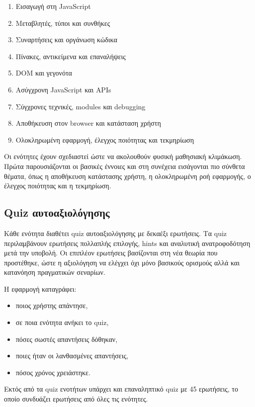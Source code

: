 \documentclass[12pt,a4paper]{article}
\newcommand{\textlatin}[1]{\textenglish{#1}}
\begin{document}
\begin{enumerate}[leftmargin=1.2cm]
  \item Εισαγωγή στη \textlatin{JavaScript}
  \item Μεταβλητές, τύποι και συνθήκες
  \item Συναρτήσεις και οργάνωση κώδικα
  \item Πίνακες, αντικείμενα και επαναλήψεις
  \item \textlatin{DOM} και γεγονότα
  \item Ασύγχρονη \textlatin{JavaScript} και \textlatin{APIs}
  \item Σύγχρονες τεχνικές, \textlatin{modules} και debugging
  \item Αποθήκευση στον browser και κατάσταση χρήστη
  \item Ολοκληρωμένη εφαρμογή, έλεγχος ποιότητας και τεκμηρίωση
\end{enumerate}

Οι ενότητες έχουν σχεδιαστεί ώστε να ακολουθούν φυσική μαθησιακή κλιμάκωση. Πρώτα παρουσιάζονται οι βασικές έννοιες και στη συνέχεια εισάγονται πιο σύνθετα θέματα, όπως η αποθήκευση κατάστασης χρήστη, η ολοκληρωμένη ροή εφαρμογής, ο έλεγχος ποιότητας και η τεκμηρίωση.

\subsection{Quiz αυτοαξιολόγησης}

Κάθε ενότητα διαθέτει quiz αυτοαξιολόγησης με δεκαέξι ερωτήσεις. Τα quiz περιλαμβάνουν ερωτήσεις πολλαπλής επιλογής, hints και αναλυτική ανατροφοδότηση μετά την υποβολή. Οι επιπλέον ερωτήσεις βασίζονται στη νέα θεωρία που προστέθηκε, ώστε η αξιολόγηση να ελέγχει όχι μόνο βασικούς ορισμούς αλλά και κατανόηση πραγματικών σεναρίων.

Η εφαρμογή καταγράφει:

\begin{itemize}[leftmargin=1.2cm]
  \item ποιος χρήστης απάντησε,
  \item σε ποια ενότητα ανήκει το quiz,
  \item πόσες σωστές απαντήσεις δόθηκαν,
  \item ποιες ήταν οι λανθασμένες απαντήσεις,
  \item πόσος χρόνος χρειάστηκε.
\end{itemize}

Εκτός από τα quiz ενοτήτων υπάρχει και επαναληπτικό quiz με 45 ερωτήσεις, το οποίο συνδυάζει ερωτήσεις από όλες τις ενότητες.
\end{document}
